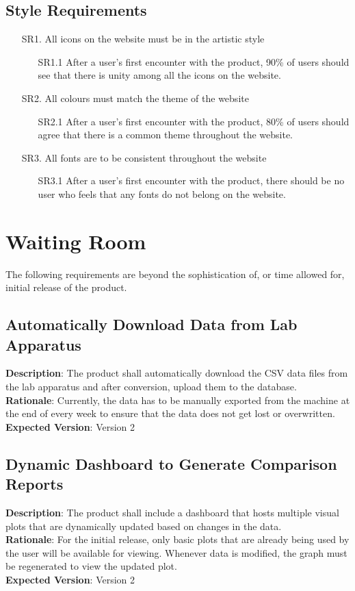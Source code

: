 \documentclass[12pt]{article}
\begin{document}
\subsection{Style Requirements}
\begin{itemize}
  \item [SR1.] All icons on the website must be in the artistic style
  \begin{itemize}
    \item [SR1.1] After a user's first encounter with the product, 90\% of users should
    see that there is unity among all the icons on the website. 
  \end{itemize}
  \item [SR2.] All colours must match the theme of the website
  \begin{itemize}
    \item [SR2.1] After a user's first encounter with the product, 80\% of users
    should agree that there is a common theme throughout the website.
  \end{itemize}
  \item [SR3.] All fonts are to be consistent throughout the website 
  \begin{itemize}
    \item [SR3.1] After a user's first encounter with the product, there should
    be no user who feels that any fonts do not belong on the website. 
  \end{itemize}
\end{itemize}

\section{Waiting Room}
The following requirements are beyond the sophistication of, or time allowed for, initial release of the product.
\subsection{Automatically Download Data from Lab Apparatus}
\textbf{Description}: The product shall automatically download the CSV data files from the lab apparatus and after conversion, upload them to the database.\\
\textbf{Rationale}: Currently, the data has to be manually exported from the machine at the end of every week to ensure that the data does not get lost or overwritten.\\
\textbf{Expected Version}: Version 2

\subsection{Dynamic Dashboard to Generate Comparison Reports}
\textbf{Description}: The product shall include a dashboard that hosts multiple visual plots that are dynamically updated based on changes in the data.\\
\textbf{Rationale}: For the initial release, only basic plots that are already being used by the user will be available for viewing. Whenever data is modified, the graph
must be regenerated to view the updated plot.\\
\textbf{Expected Version}: Version 2
\end{document}
